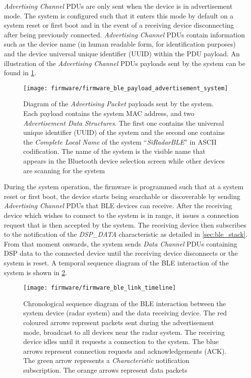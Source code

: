 \textit{Advertising Channel} PDUs are only sent when the device is in advertisement mode. The system is configured such that it enters this mode by default on a system reset or first boot and in the event of a receiving device disconnecting after being previously connected. \textit{Advertising Channel} PDUs contain information such as the device name (in human readable form, for identification purposes) and the device universal unique identifier (UUID) within the PDU payload. An illustration of the \textit{Advertising Channel} PDUs payloads sent by the system can be found in \cref{fig:firmware_ble_payload_advertisement_system}.

\begin{figure}[ht]
	\centering
	\texttt{[image: firmware/firmware\_ble\_payload\_advertisement\_system]}
	\caption{Diagram of the \textit{Advertising Packet} payloads sent by the system. Each payload contains the system MAC address, and two \textit{Advertisement Data Structures}. The first one contains the universal unique identifier (UUID) of the system and the second one contains the \textit{Complete Local Name} of the system ``\textit{SiRadarBLE}'' in ASCII codification. The name of the system is the visible name that appears in the Bluetooth device selection screen while other devices are scanning for the system
	\label{fig:firmware_ble_payload_advertisement_system}}
\end{figure}

During the system operation, the firmware is programmed such that at a system reset or first boot, the device starts being searchable or discoverable by sending \textit{Advertising Channel} PDUs that BLE devices can receive. After the receiving device which wishes to connect to the system is in range, it issues a connection request that is then accepted by the system. The receiving device then subscribes to the notification of the \textit{DSP\_DATA} characteristic as detailed in \cref{sec:ble_stack}. From that moment onwards, the system sends \textit{Data Channel} PDUs containing DSP data to the connected device until the receiving device disconnects or the system is reset. A temporal sequence diagram of the BLE interaction of the system is shown in \cref{fig:firmware_ble_link_timeline}.


\begin{figure}[!ht]
	\centering
	\texttt{[image: firmware/firmware\_ble\_link\_timeline]}
	\caption{Chronological sequence diagram of the BLE interaction between the system device (radar system) and the data receiving device. The red coloured arrows represent packets sent during the advertisement mode, broadcast to all devices near the radar system. The receiving device idles until it requests a connection to the system. The blue arrows represent connection requests and acknowledgements (ACK). The green arrow represents a \textit{Characteristic} notification subscription. The orange arrows represent data packets
		\label{fig:firmware_ble_link_timeline}}
\end{figure}


